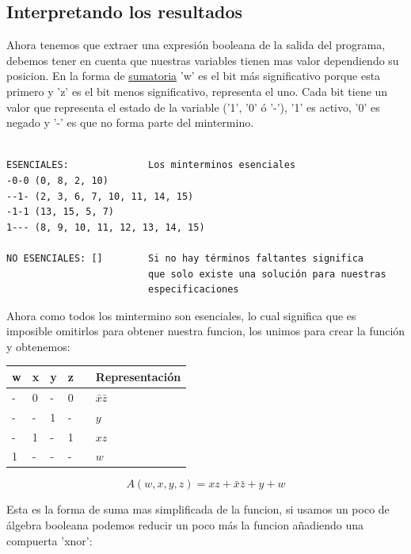 \documentclass[11pt]{article}
\begin{document}
\newpage

\subsection*{Interpretando los resultados}
\label{sec:org02e39f3}
Ahora tenemos que extraer una expresión booleana de la salida del programa,
debemos tener en cuenta que nuestras variables tienen mas valor dependiendo 
su posicion. En la forma de \hyperref[orga6e9a70]{sumatoria} 'w' es el bit más significativo porque 
esta primero y 'z' es el bit menos significativo, representa el uno. Cada bit
tiene un valor que representa el estado de la variable ('1', '0' ó '-'), '1' 
es activo, '0' es negado  y '-' es que no forma parte del mintermino.

\begin{verbatim}

ESENCIALES:              Los minterminos esenciales
-0-0 (0, 8, 2, 10)                 
--1- (2, 3, 6, 7, 10, 11, 14, 15)
-1-1 (13, 15, 5, 7)
1--- (8, 9, 10, 11, 12, 13, 14, 15)

NO ESENCIALES: []        Si no hay términos faltantes significa
                         que solo existe una solución para nuestras
                         especificaciones

\end{verbatim}

Ahora como todos los mintermino son esenciales, lo cual significa que es 
imposible omitirlos para obtener nuestra funcion, los unimos para crear la 
función y obtenemos:

\begin{center}
\begin{tabular}{llllll}
w & x & y & z &  & Representación\\
\hline
- & 0 & - & 0 &  & \(\bar x \bar z\)\\
- & - & 1 & - &  & \(y\)\\
- & 1 & - & 1 &  & \(xz\)\\
1 & - & - & - &  & \(w\)\\
\hline
\end{tabular}
\end{center}

\begin{equation}
A(w,x,y,z) = xz + \bar x \bar z + y + w
\end{equation}

Esta es la forma de suma mas simplificada de la funcion, si usamos un poco de 
álgebra booleana podemos reducir un poco más la funcion añadiendo una compuerta
'xnor':
\end{document}
